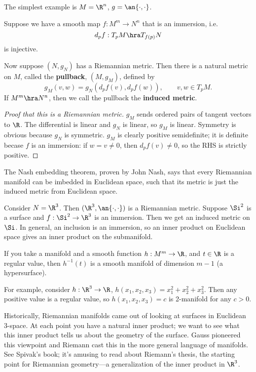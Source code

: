 \begin{ex}
The simplest example is $M=\R^n$, $g=\an{\cdot,\cdot}$. 
\end{ex}

\begin{df}
Suppose we have a smooth map $f:M^m\to N^n$ that is an immersion, i.e. 
\[
d_pf:T_pM\hra T_{f(p)}N
\]
is injective.

Now suppose $(N,g_N)$ has a Riemannian metric. Then there is a natural metric on $M$, called the \textbf{pullback}, $(M,g_M)$, defined by
\[
g_M(v,w)=g_N(d_pf(v),d_pf(w)),\qquad v,w\in T_pM.
\]
If $M^m\hra N^n$, then we call the pullback the \textbf{induced metric}.
\end{df}
\begin{proof}[Proof that this is a Riemannian metric]
$g_M$ sends ordered pairs of tangent vectors to $\R$. The differential is linear and $g_N$ is linear, so $g_M$ is linear. Symmetry is obvious because $g_N$ is symmetric. $g_M$ is clearly positive semidefinite; it is definite becase $f$ is an immersion: if $w=v\ne 0$, then $d_pf(v)\ne 0$, so the RHS is strictly positive.
\end{proof}
The Nash embedding theorem, proven by John Nash, says that every Riemannian manifold can be imbedded in Euclidean space, such that its metric is just the induced metric from Euclidean space.
\begin{ex}
Consider $N=\R^3$. Then $(\R^3,\an{\cdot,\cdot})$ is a Riemannian metric. Suppose $\Si^2$ is a surface and $f:\Si^2\to \R^3$ is an immersion. Then we get an induced metric on $\Si$.
In general, an inclusion is an immersion, so an inner product on Euclidean space gives an inner product on the submanifold.

If you take a manifold and a smooth function $h:M^m\to \R$, and $t\in \R$ is a regular value, %
then $h^{-1}(t)$ is a smooth manifold of dimension $m-1$ (a hypersurface). 

For example, consider $h:\R^3\to \R$, $h(x_1,x_2,x_3)=x_1^2+x_2^2+x_3^2$.
Then any positive value is a regular value, so $h(x_1,x_2,x_3)=c$ is 2-manifold for any $c>0$.
\end{ex}
Historically, Riemannian manifolds came out of looking at surfaces in Euclidean 3-space. At each point you have a natural inner product; we want to see what this inner product tells us about the geometry of the surface. Gauss pioneered this viewpoint and Riemann cast this in the more general language of manifolds. See Spivak's book; it's amusing to read about Riemann's thesis, the starting point for Riemannian geometry---a generalization of the inner product in $\R^3$.


